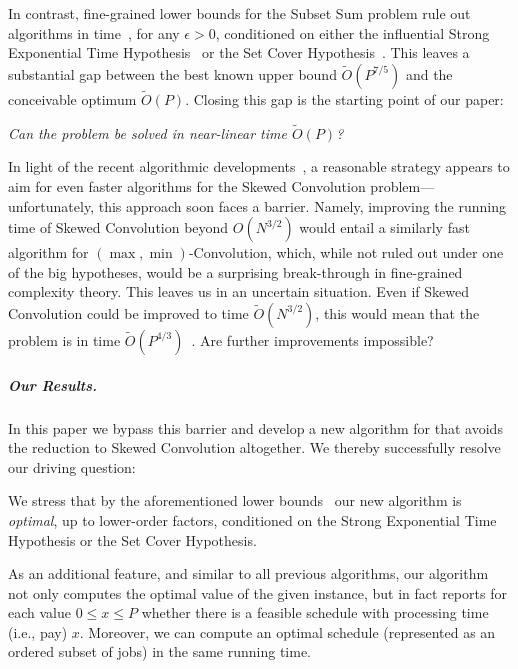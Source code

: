 \documentclass[10pt,a4paper]{article}
\makeatletter
\newcommand\IfRestateTF{%
  \ifx\label\thmt@gobble@label %
    \expandafter\@firstoftwo
  \else
    \expandafter\@secondoftwo
  \fi
}
\newcommand{\RestateRemark}{\IfRestateTF{{\normalfont\bfseries (Restated) }}{}}
\newcommand\Order{O}
\newcommand\order{o}
\newcommand\MTPT{\smash{$1||\sum p_j U_j$}}
\makeatother
\begin{document}
In contrast, fine-grained lower bounds for the Subset Sum problem rule out \MTPT{} algorithms in time~\smash{$\Order(P^{1-\epsilon} \cdot n^{\Order(1)})$}, for any $\epsilon > 0$, conditioned on either the influential Strong Exponential Time Hypothesis~\cite{AbboudBHS19} or the Set Cover Hypothesis~\cite{CyganDLMNOPSW16}. This leaves a substantial gap between the best known upper bound $\widetilde\Order(P^{7/5})$ and the conceivable optimum $\widetilde\Order(P)$. Closing this gap is the starting point of our paper:
\begin{center}
    \medskip
    \emph{Can the \MTPT{} problem be solved in near-linear time $\widetilde\Order(P)$?}
    \medskip
\end{center}
In light of the recent algorithmic developments~\cite{BringmannFHSW22,KleinPR23,SchieberS23}, a reasonable strategy appears to aim for even faster algorithms for the Skewed Convolution problem---unfortunately, this approach soon faces a barrier. Namely, improving the running time of Skewed Convolution beyond $\Order(N^{3/2})$ would entail a similarly fast algorithm for $(\max, \min)$-Convolution, which, while not ruled out under one of the big hypotheses, would be a surprising break-through in fine-grained complexity theory. This leaves us in an uncertain situation. Even if Skewed Convolution could be improved to time $\widetilde\Order(N^{3/2})$, this would mean that the \MTPT{} problem is in time $\widetilde\Order(P^{4/3})$~\cite{SchieberS23}. Are further improvements impossible?

\subparagraph{Our Results.}
In this paper we bypass this barrier and develop a new algorithm for \MTPT{} that avoids the reduction to Skewed Convolution altogether. We thereby successfully resolve our driving question:




We stress that by the aforementioned lower bounds~\cite{AbboudBHS19,CyganDLMNOPSW16} our new algorithm is \emph{optimal}, up to lower-order factors, conditioned on the Strong Exponential Time Hypothesis or the Set Cover Hypothesis.

As an additional feature, and similar to all previous algorithms, our algorithm not only computes the optimal value of the given instance, but in fact reports for each value $0 \leq x \leq P$ whether there is a feasible schedule with processing time (i.e., pay) $x$. Moreover, we can compute an optimal schedule (represented as an ordered subset of jobs) in the same running time.
\end{document}
